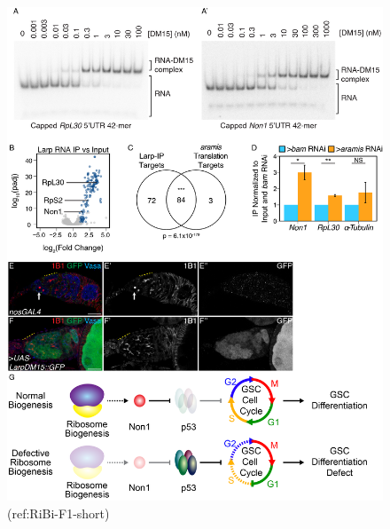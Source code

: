 \documentclass[12pt,oneside]{reedthesis}
\begin{document}
\begin{figure}

{\centering \includegraphics[width=6.5 in,height=8.9375 in]{./figure/Ribosome Biogenesis/Ribosome Biogenesis 7} 

}

\caption[(ref:RiBi-F1-short)]{(ref:RiBi-F1-short)}\label{fig:unnamed-chunk-18}
\end{figure}
\end{document}
